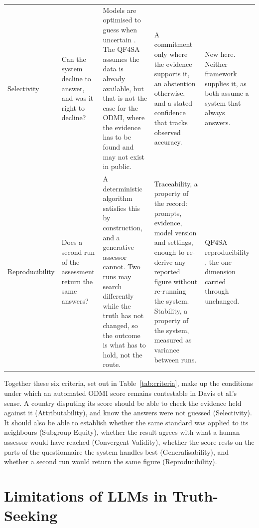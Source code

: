 {\begin{longtable}[]{@{}
  L{0.1565}
  L{0.1568}
  L{0.2586}
  L{0.2295}
  L{0.1985}@{}}
Selectivity & Can the system decline to answer, and was it right to decline? & Models are optimised to guess when uncertain \citep{kalai2025}. The QF4SA assumes the data is already available, but that is not the case for the ODMI, where the evidence has to be found and may not exist in public. & A commitment only where the evidence supports it, an abstention otherwise, and a stated confidence that tracks observed accuracy. & New here. Neither framework supplies it, as both assume a system that always answers. \\
Reproduc\-ibility & Does a second run of the assessment return the same answers? & A deterministic algorithm satisfies this by construction, and a generative assessor cannot. Two runs may search differently while the truth has not changed, so the outcome is what has to hold, not the route. & Traceability, a property of the record: prompts, evidence, model version and settings, enough to re-derive any reported figure without re-running the system. Stability, a property of the system, measured as variance between runs. & QF4SA reproducibility \citep{yung2022}, the one dimension carried through unchanged. \\
\end{longtable}
}

Together these six criteria, set out in Table~\ref{tab:criteria}, make up the conditions under which an automated ODMI score remains contestable in Davis et al.'s sense. A country disputing its score should be able to check the evidence held against it (Attributability), and know the answers were not guessed (Selectivity). It should also be able to establish whether the same standard was applied to its neighbours (Subgroup Equity), whether the result agrees with what a human assessor would have reached (Convergent Validity), whether the score rests on the parts of the questionnaire the system handles best (Generalisability), and whether a second run would return the same figure (Reproducibility).

\section{Limitations of LLMs in Truth-Seeking}\label{sec:llm-limitations}

